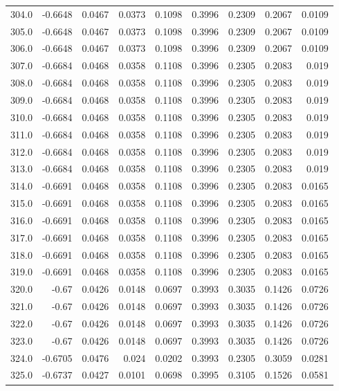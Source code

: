 \begin{longtable}{lrrrrrrrr}
304.0 & -0.6648 & 0.0467 & 0.0373 & 0.1098 & 0.3996 & 0.2309 & 0.2067 & 0.0109 \\
305.0 & -0.6648 & 0.0467 & 0.0373 & 0.1098 & 0.3996 & 0.2309 & 0.2067 & 0.0109 \\
306.0 & -0.6648 & 0.0467 & 0.0373 & 0.1098 & 0.3996 & 0.2309 & 0.2067 & 0.0109 \\
307.0 & -0.6684 & 0.0468 & 0.0358 & 0.1108 & 0.3996 & 0.2305 & 0.2083 & 0.019 \\
308.0 & -0.6684 & 0.0468 & 0.0358 & 0.1108 & 0.3996 & 0.2305 & 0.2083 & 0.019 \\
309.0 & -0.6684 & 0.0468 & 0.0358 & 0.1108 & 0.3996 & 0.2305 & 0.2083 & 0.019 \\
310.0 & -0.6684 & 0.0468 & 0.0358 & 0.1108 & 0.3996 & 0.2305 & 0.2083 & 0.019 \\
311.0 & -0.6684 & 0.0468 & 0.0358 & 0.1108 & 0.3996 & 0.2305 & 0.2083 & 0.019 \\
312.0 & -0.6684 & 0.0468 & 0.0358 & 0.1108 & 0.3996 & 0.2305 & 0.2083 & 0.019 \\
313.0 & -0.6684 & 0.0468 & 0.0358 & 0.1108 & 0.3996 & 0.2305 & 0.2083 & 0.019 \\
314.0 & -0.6691 & 0.0468 & 0.0358 & 0.1108 & 0.3996 & 0.2305 & 0.2083 & 0.0165 \\
315.0 & -0.6691 & 0.0468 & 0.0358 & 0.1108 & 0.3996 & 0.2305 & 0.2083 & 0.0165 \\
316.0 & -0.6691 & 0.0468 & 0.0358 & 0.1108 & 0.3996 & 0.2305 & 0.2083 & 0.0165 \\
317.0 & -0.6691 & 0.0468 & 0.0358 & 0.1108 & 0.3996 & 0.2305 & 0.2083 & 0.0165 \\
318.0 & -0.6691 & 0.0468 & 0.0358 & 0.1108 & 0.3996 & 0.2305 & 0.2083 & 0.0165 \\
319.0 & -0.6691 & 0.0468 & 0.0358 & 0.1108 & 0.3996 & 0.2305 & 0.2083 & 0.0165 \\
320.0 & -0.67 & 0.0426 & 0.0148 & 0.0697 & 0.3993 & 0.3035 & 0.1426 & 0.0726 \\
321.0 & -0.67 & 0.0426 & 0.0148 & 0.0697 & 0.3993 & 0.3035 & 0.1426 & 0.0726 \\
322.0 & -0.67 & 0.0426 & 0.0148 & 0.0697 & 0.3993 & 0.3035 & 0.1426 & 0.0726 \\
323.0 & -0.67 & 0.0426 & 0.0148 & 0.0697 & 0.3993 & 0.3035 & 0.1426 & 0.0726 \\
324.0 & -0.6705 & 0.0476 & 0.024 & 0.0202 & 0.3993 & 0.2305 & 0.3059 & 0.0281 \\
325.0 & -0.6737 & 0.0427 & 0.0101 & 0.0698 & 0.3995 & 0.3105 & 0.1526 & 0.0581 \\

\end{longtable}
